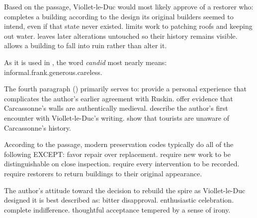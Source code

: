 \documentclass[11pt]{article}
\begin{document}
{Based on the passage, Viollet-le-Duc would most likely approve of a restorer who:}
{completes a building according to the design its original builders seemed to intend, even if that state never existed.}
{limits work to patching roofs and keeping out water.}
{leaves later alterations untouched so their history remains visible.}
{allows a building to fall into ruin rather than alter it.}

{As it is used in , the word \emph{candid} most nearly means:}
{informal.}{frank.}{generous.}{careless.}

{The fourth paragraph () primarily serves to:}
{provide a personal experience that complicates the author's earlier agreement with Ruskin.}
{offer evidence that Carcassonne's walls are authentically medieval.}
{describe the author's first encounter with Viollet-le-Duc's writing.}
{show that tourists are unaware of Carcassonne's history.}

{According to the passage, modern preservation codes typically do all of the following EXCEPT:}
{favor repair over replacement.}
{require new work to be distinguishable on close inspection.}
{require every intervention to be recorded.}
{require restorers to return buildings to their original appearance.}

{The author's attitude toward the decision to rebuild the spire as Viollet-le-Duc designed it is best described as:}
{bitter disapproval.}
{enthusiastic celebration.}
{complete indifference.}
{thoughtful acceptance tempered by a sense of irony.}
\end{document}
